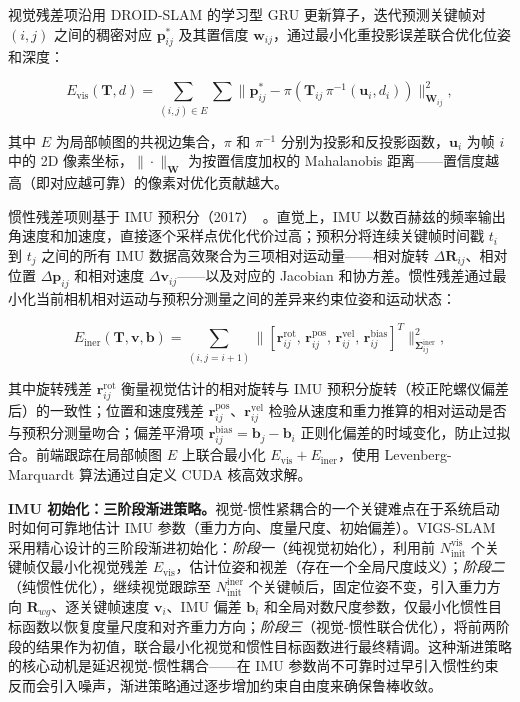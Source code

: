 视觉残差项沿用 DROID-SLAM 的学习型 GRU 更新算子，迭代预测关键帧对 $(i, j)$ 之间的稠密对应 $\mathbf{p}^{*}_{ij}$ 及其置信度 $\mathbf{w}_{ij}$，通过最小化重投影误差联合优化位姿和深度：

\begin{equation}
    E_{\mathrm{vis}}(\mathbf{T}, d) = \sum_{(i,j) \in E} \sum \| \mathbf{p}^{*}_{ij} - \pi(\mathbf{T}_{ij}\,\pi^{-1}(\mathbf{u}_i, d_i)) \|_{\mathbf{W}_{ij}}^2,
\end{equation}

其中 $E$ 为局部帧图的共视边集合，$\pi$ 和 $\pi^{-1}$ 分别为投影和反投影函数，$\mathbf{u}_i$ 为帧 $i$ 中的 2D 像素坐标，$\| \cdot \|_{\mathbf{W}}$ 为按置信度加权的 Mahalanobis 距离——置信度越高（即对应越可靠）的像素对优化贡献越大。

惯性残差项则基于 IMU 预积分（2017）~\cite{forster2015imu}。直觉上，IMU 以数百赫兹的频率输出角速度和加速度，直接逐个采样点优化代价过高；预积分将连续关键帧时间戳 $t_i$ 到 $t_j$ 之间的所有 IMU 数据高效聚合为三项相对运动量——相对旋转 $\Delta \mathbf{R}_{ij}$、相对位置 $\Delta \mathbf{p}_{ij}$ 和相对速度 $\Delta \mathbf{v}_{ij}$——以及对应的 Jacobian 和协方差。惯性残差通过最小化当前相机相对运动与预积分测量之间的差异来约束位姿和运动状态：

\begin{equation}
    E_{\mathrm{iner}}(\mathbf{T}, \mathbf{v}, \mathbf{b}) = \sum_{(i, j=i+1)} \| [\mathbf{r}^{\mathrm{rot}}_{ij},\, \mathbf{r}^{\mathrm{pos}}_{ij},\, \mathbf{r}^{\mathrm{vel}}_{ij},\, \mathbf{r}^{\mathrm{bias}}_{ij}]^T \|_{\boldsymbol{\Sigma}_{ij}^{\mathrm{iner}}}^2,
\end{equation}

其中旋转残差 $\mathbf{r}^{\mathrm{rot}}_{ij}$ 衡量视觉估计的相对旋转与 IMU 预积分旋转（校正陀螺仪偏差后）的一致性；位置和速度残差 $\mathbf{r}^{\mathrm{pos}}_{ij}$、$\mathbf{r}^{\mathrm{vel}}_{ij}$ 检验从速度和重力推算的相对运动是否与预积分测量吻合；偏差平滑项 $\mathbf{r}^{\mathrm{bias}}_{ij} = \mathbf{b}_j - \mathbf{b}_i$ 正则化偏差的时域变化，防止过拟合。前端跟踪在局部帧图 $E$ 上联合最小化 $E_{\mathrm{vis}} + E_{\mathrm{iner}}$，使用 Levenberg-Marquardt 算法通过自定义 CUDA 核高效求解。

\textbf{IMU 初始化：三阶段渐进策略。}视觉-惯性紧耦合的一个关键难点在于系统启动时如何可靠地估计 IMU 参数（重力方向、度量尺度、初始偏差）。VIGS-SLAM 采用精心设计的三阶段渐进初始化：\emph{阶段一}（纯视觉初始化），利用前 $N^{\mathrm{vis}}_{\mathrm{init}}$ 个关键帧仅最小化视觉残差 $E_{\mathrm{vis}}$，估计位姿和视差（存在一个全局尺度歧义）；\emph{阶段二}（纯惯性优化），继续视觉跟踪至 $N^{\mathrm{iner}}_{\mathrm{init}}$ 个关键帧后，固定位姿不变，引入重力方向 $\mathbf{R}_{wg}$、逐关键帧速度 $\mathbf{v}_i$、IMU 偏差 $\mathbf{b}_i$ 和全局对数尺度参数，仅最小化惯性目标函数以恢复度量尺度和对齐重力方向；\emph{阶段三}（视觉-惯性联合优化），将前两阶段的结果作为初值，联合最小化视觉和惯性目标函数进行最终精调。这种渐进策略的核心动机是延迟视觉-惯性耦合——在 IMU 参数尚不可靠时过早引入惯性约束反而会引入噪声，渐进策略通过逐步增加约束自由度来确保鲁棒收敛。

